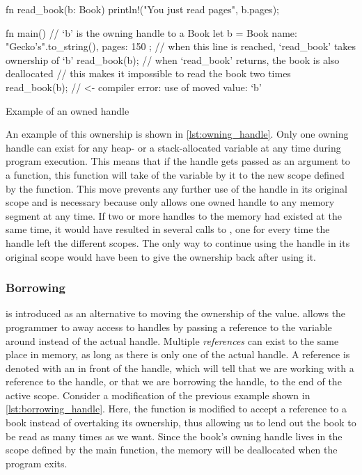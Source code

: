 \begin{listing}[tb]
\begin{rustcode}
fn read_book(b: Book) {
  println!("You just read {} pages", b.pages);
}

fn main() {
  // `b' is the owning handle to a Book
  let b = Book { name: "Gecko's".to_string(), pages: 150 };
  // when this line is reached, `read_book' takes ownership of `b'
  read_book(b);
  // when `read_book' returns, the book is also deallocated
  // this makes it impossible to  read the book two times
  read_book(b); // <- compiler error: use of moved value: `b'
}
\end{rustcode}
\caption{Example of an owned handle}
\label{lst:owning_handle}
\end{listing}

An example of this ownership is shown in \autoref{lst:owning_handle}.
Only one owning handle can exist for any heap- or a stack-allocated variable at any time during program execution.
This means that if the handle gets passed as an argument to a function, this function will take  of the variable by  it to the new scope defined by the function.
This move prevents any further use of the handle in its original scope and is necessary because {\rust} only allows one owned handle to any memory segment at any time.
If two or more handles to the memory had existed at the same time, it would have resulted in several calls to , one for every time the handle left the different scopes.
The only way to continue using the handle in its original scope would have been to give the ownership back after using it.

\subsubsection{Borrowing}
\label{ssec:borrowing}

 is introduced as an alternative to moving the ownership of the value.
{\rust} allows the programmer to  away access to handles by passing a reference to the variable around instead of the actual handle.
Multiple \emph{references} can exist to the same place in memory, as long as there is only one  of the actual handle.
A reference is denoted with an \code{\&} in front of the handle, which will tell {\rust} that we are working with a reference to the handle, or that we are borrowing the handle, to the end of the active scope.
Consider a modification of the previous example shown in \autoref{lst:borrowing_handle}.
Here, the  function is modified to accept a reference to a book instead of overtaking its ownership, thus allowing us to lend out the book to be read as many times as we want.
Since the book's owning handle lives in the scope defined by the main function, the memory will be deallocated when the program exits.

